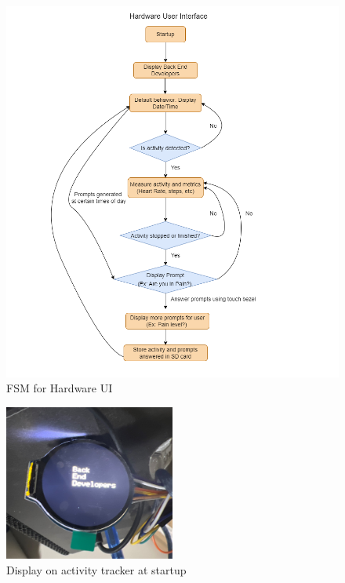 \documentclass[12pt, titlepage]{article}
\begin{document}
\begin{figure}[H]
	\begin{center}
		 \includegraphics[width=1\textwidth]{HardwareUI_FSM}
		\caption{FSM for Hardware UI}
		\label{HardwareUI_FSM} 
	\end{center}
\end{figure}

\begin{figure}[H]
	\begin{center}
		 \includegraphics[width=0.5\textwidth]{BEDDisplay}
		\caption{Display on activity tracker at startup}
		\label{BEDDisplay} 
	\end{center}
\end{figure}
\end{document}

